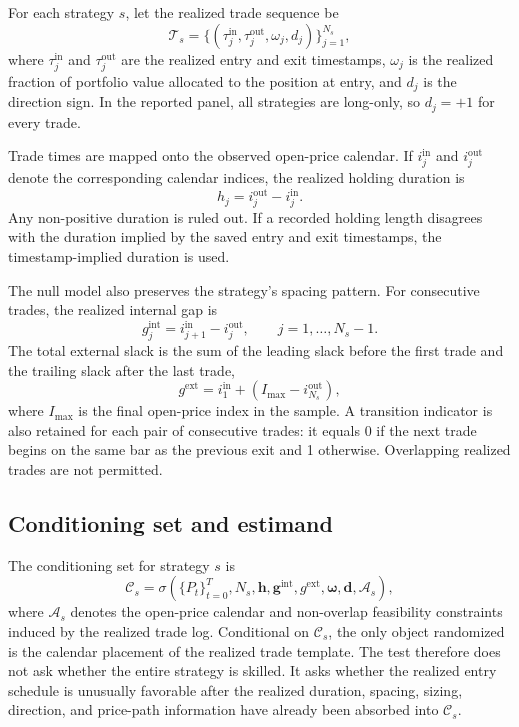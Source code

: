 \documentclass[preprint,12pt]{elsarticle}
\theoremstyle{definition}
\begin{document}
For each strategy \(s\), let the realized trade sequence be
\begin{equation}
\mathcal{T}_s=\{(\tau^{\mathrm{in}}_j,\tau^{\mathrm{out}}_j,\omega_j,d_j)\}_{j=1}^{N_s},
\end{equation}
where \(\tau^{\mathrm{in}}_j\) and \(\tau^{\mathrm{out}}_j\) are the realized entry and exit timestamps, \(\omega_j\) is the realized fraction of portfolio value allocated to the position at entry, and \(d_j\) is the direction sign. In the reported panel, all strategies are long-only, so \(d_j=+1\) for every trade.

Trade times are mapped onto the observed open-price calendar. If \(i^{\mathrm{in}}_j\) and \(i^{\mathrm{out}}_j\) denote the corresponding calendar indices, the realized holding duration is
\begin{equation}
h_j=i^{\mathrm{out}}_j-i^{\mathrm{in}}_j.
\end{equation}
Any non-positive duration is ruled out. If a recorded holding length disagrees with the duration implied by the saved entry and exit timestamps, the timestamp-implied duration is used.

The null model also preserves the strategy's spacing pattern. For consecutive trades, the realized internal gap is
\begin{equation}
g^{\mathrm{int}}_j=i^{\mathrm{in}}_{j+1}-i^{\mathrm{out}}_j,\qquad j=1,\ldots,N_s-1.
\end{equation}
The total external slack is the sum of the leading slack before the first trade and the trailing slack after the last trade,
\begin{equation}
g^{\mathrm{ext}} = i^{\mathrm{in}}_1 + \left(I_{\max}-i^{\mathrm{out}}_{N_s}\right),
\end{equation}
where \(I_{\max}\) is the final open-price index in the sample. A transition indicator is also retained for each pair of consecutive trades: it equals 0 if the next trade begins on the same bar as the previous exit and 1 otherwise. Overlapping realized trades are not permitted.

\subsection{Conditioning set and estimand}
\label{sec:conditioning-estimand}

The conditioning set for strategy $s$ is
\[
\mathcal{C}_s =
\sigma\!\left(
\{P_t\}_{t=0}^{T},
N_s,
\mathbf{h},
\mathbf{g}^{\mathrm{int}},
g^{\mathrm{ext}},
\boldsymbol{\omega},
\mathbf{d},
\mathcal{A}_s
\right),
\]
where $\mathcal{A}_s$ denotes the open-price calendar and non-overlap feasibility constraints induced by the realized trade log. Conditional on $\mathcal{C}_s$, the only object randomized is the calendar placement of the realized trade template. The test therefore does not ask whether the entire strategy is skilled. It asks whether the realized entry schedule is unusually favorable after the realized duration, spacing, sizing, direction, and price-path information have already been absorbed into $\mathcal{C}_s$.
\end{document}
